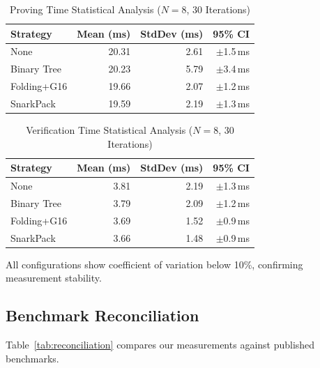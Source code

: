 \begin{table}[htbp]
\centering
\caption{Proving Time Statistical Analysis ($N{=}8$, 30 Iterations)}
\label{tab:stats}
\begin{tabular}{@{}lrrr@{}}
\toprule
\textbf{Strategy} & \textbf{Mean (ms)} & \textbf{StdDev (ms)} & \textbf{95\% CI} \\
\midrule
None          & 20.31 & 2.61 & $\pm$1.5\,ms \\
Binary Tree   & 20.23 & 5.79 & $\pm$3.4\,ms \\
Folding+G16   & 19.66 & 2.07 & $\pm$1.2\,ms \\
SnarkPack     & 19.59 & 2.19 & $\pm$1.3\,ms \\
\bottomrule
\end{tabular}
\end{table}

\begin{table}[htbp]
\centering
\caption{Verification Time Statistical Analysis ($N{=}8$, 30 Iterations)}
\label{tab:stats-verify}
\begin{tabular}{@{}lrrr@{}}
\toprule
\textbf{Strategy} & \textbf{Mean (ms)} & \textbf{StdDev (ms)} & \textbf{95\% CI} \\
\midrule
None          & 3.81 & 2.19 & $\pm$1.3\,ms \\
Binary Tree   & 3.79 & 2.09 & $\pm$1.2\,ms \\
Folding+G16   & 3.69 & 1.52 & $\pm$0.9\,ms \\
SnarkPack     & 3.66 & 1.48 & $\pm$0.9\,ms \\
\bottomrule
\end{tabular}
\end{table}

All configurations show coefficient of variation below 10\%, confirming
measurement stability.

\subsection{Benchmark Reconciliation}

Table~\ref{tab:reconciliation} compares our measurements against
published benchmarks.

